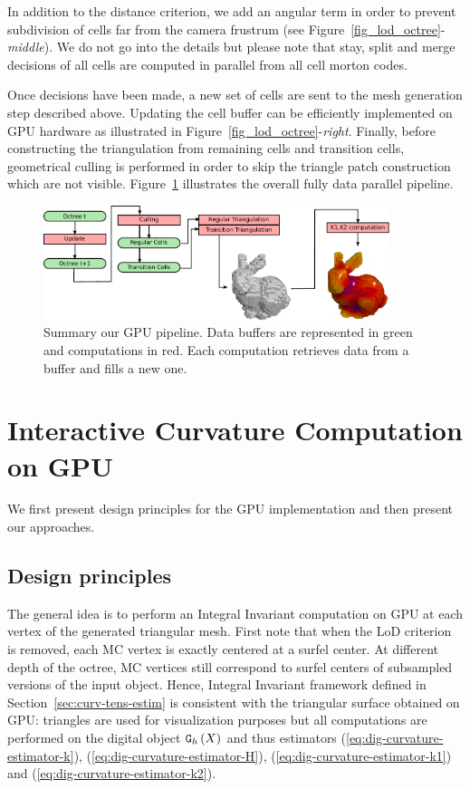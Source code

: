 \documentclass{llncs}
\begin{document}
%
In addition to the distance criterion, we add an angular term in order
to prevent subdivision of cells far from the camera frustrum (see
Figure~\ref{fig_lod_octree}-\emph{middle}). We do not go into the
details but please note that stay, split and merge decisions of all cells are computed in
parallel from all cell morton codes.

Once decisions have been made, a new set of cells are sent to the mesh
generation step described above. Updating the cell buffer can be
efficiently implemented on GPU hardware as illustrated in
Figure~\ref{fig_lod_octree}-\emph{right}.  Finally, before
constructing the triangulation from remaining cells and transition
cells, geometrical culling is performed in order to skip the triangle
patch construction which are not visible. Figure~\ref{fig_pipeline}
illustrates the overall fully data parallel pipeline.

\begin{figure}[!htbp]
  \centering
  \includegraphics[width=0.9\textwidth]{figs/pipeline2}
  \caption{ Summary our GPU pipeline. Data buffers are
    represented in green and computations in red. Each computation
    retrieves data from a buffer and fills a new one. }
  \label{fig_pipeline}
\end{figure}




\section{Interactive Curvature Computation on GPU}
\label{sec:inter-visu-gpu}

We first present design principles for the GPU implementation and then
present our approaches.

\subsection{Design principles}

The general idea is to perform an Integral Invariant computation on
GPU at each vertex of the generated triangular mesh. First note that
when the LoD criterion is removed, each MC vertex is exactly centered at
a surfel center. At different depth of the octree, MC vertices still
correspond to surfel centers of subsampled versions of the input
object. Hence, Integral Invariant framework defined in
Section~\ref{sec:curv-tens-estim} is consistent with the triangular
surface obtained on GPU: triangles are used for visualization purposes
but all computations are performed on the digital object $\mathtt{G}_{h}\left(X\right)$ and thus
estimators
(\ref{eq:dig-curvature-estimator-k}),
(\ref{eq:dig-curvature-estimator-H}), (\ref{eq:dig-curvature-estimator-k1})
and (\ref{eq:dig-curvature-estimator-k2}).
\end{document}
